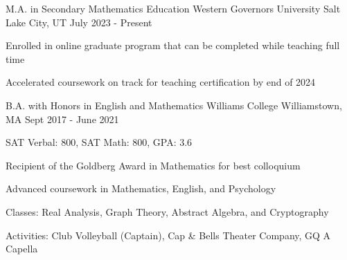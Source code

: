 \begin{cventries}
  \cventry
  {M.A. in Secondary Mathematics Education}
  {Western Governors University}
  {Salt Lake City, UT}
  {July 2023 - Present}
  {
    \begin{cvitems}
      \item {Enrolled in online graduate program that can be completed while teaching full time}
      \item {Accelerated coursework on track for teaching certification by end of 2024}
    \end{cvitems}
  }
  \cventry
  {B.A. with Honors in English and Mathematics}
  {Williams College}
  {Williamstown, MA}
  {Sept 2017 - June 2021}
  {
    \begin{cvitems}
      \item {SAT Verbal: 800, SAT Math: 800, GPA: 3.6}
      \item {Recipient of the Goldberg Award in Mathematics for best colloquium}
      \item {Advanced coursework in Mathematics, English, and Psychology}
      \item {Classes: Real Analysis, Graph Theory, Abstract Algebra, and Cryptography}
      \item {Activities: Club Volleyball (Captain), Cap \& Bells Theater Company, GQ A Capella}
    \end{cvitems}
  }
\end{cventries}
